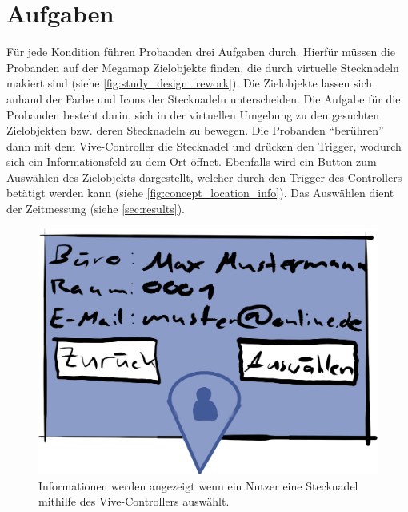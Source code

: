 \documentclass[
    draft=false,
    paper=a4,
    fontsize=12pt,
    twoside=false,
    captions=tableheading,
    british, ngerman,
]{scrartcl}
\begin{document}
\section{Aufgaben}
\label{sec:tasks}
Für jede Kondition führen Probanden drei Aufgaben durch.
Hierfür müssen die Probanden auf der Megamap Zielobjekte finden, die durch virtuelle Stecknadeln makiert sind (siehe \autoref{fig:study_design_rework}).
Die Zielobjekte lassen sich anhand der Farbe und Icons der Stecknadeln unterscheiden.
Die Aufgabe für die Probanden besteht darin, sich in der virtuellen Umgebung zu den gesuchten Zielobjekten bzw. deren Stecknadeln zu bewegen.
Die Probanden \enquote{berühren} dann mit dem Vive-Controller die Stecknadel und drücken den Trigger, wodurch sich ein Informationsfeld zu dem Ort öffnet.
Ebenfalls wird ein Button zum Auswählen des Zielobjekts dargestellt, welcher durch den Trigger des Controllers betätigt werden kann (siehe \autoref{fig:concept_location_info}).
Das Auswählen dient der Zeitmessung (siehe \autoref{sec:results}).
\begin{figure}[hbt]
    \includegraphics[width=\textwidth]{concept_location_info}
    \caption{Informationen werden angezeigt wenn ein Nutzer eine Stecknadel mithilfe des Vive-Controllers auswählt.}
    \label{fig:concept_location_info}
\end{figure}
\end{document}
